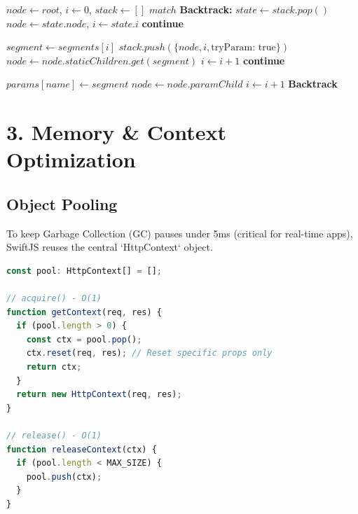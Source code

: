 \documentclass[11pt, a4paper]{article}
\begin{document}
\begin{algorithm}[H]
\caption{Iterative Radix Lookup (Optimized)}\label{alg:radix}
\begin{algorithmic}[1]
    \State $node \gets root$, $i \gets 0$, $stack \gets []$
             \Return $match$ \EndIf
            \State \textbf{Backtrack:} $state \gets stack.pop()$
            \State $node \gets state.node$, $i \gets state.i$
            \State \textbf{continue}
        \EndIf
        
        \State $segment \gets segments[i]$
        \State {}
            \State $stack.push(\{node, i, \text{tryParam: true}\})$
            \State $node \gets node.staticChildren.get(segment)$
            \State $i \gets i + 1$
            \State \textbf{continue}
        \EndIf
        
        \State {}
            \State $params[name] \gets segment$
            \State $node \gets node.paramChild$
            \State $i \gets i + 1$
        \Else
            \State \textbf{Backtrack}
        \EndIf
    \EndWhile
\EndFunction
\end{algorithmic}
\end{algorithm}

\section{3. Memory \& Context Optimization}

\subsection{Object Pooling}
To keep Garbage Collection (GC) pauses under 5ms (critical for real-time apps), SwiftJS reuses the central `HttpContext` object.

\begin{lstlisting}[language=TypeScript]
const pool: HttpContext[] = [];

// acquire() - O(1)
function getContext(req, res) {
  if (pool.length > 0) {
    const ctx = pool.pop();
    ctx.reset(req, res); // Reset specific props only
    return ctx;
  }
  return new HttpContext(req, res);
}

// release() - O(1)
function releaseContext(ctx) {
  if (pool.length < MAX_SIZE) {
    pool.push(ctx);
  }
}
\end{lstlisting}
\end{document}
